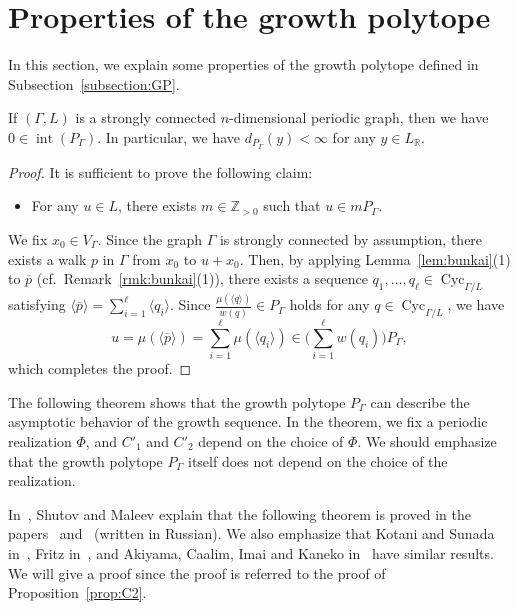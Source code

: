 \documentclass[ALCO,published]{cedram}
\theoremstyle{remark}
\begin{document}
\section{Properties of the growth polytope}\label{section:GP}

In this section, we explain some properties of the growth polytope defined in Subsection~\ref{subsection:GP}. 

\begin{lem}\label{lem:int}
If $(\Gamma, L)$ is a strongly connected $n$-dimensional periodic graph, then 
we have $0 \in \operatorname{int}(P _{\Gamma})$. 
In particular, we have $d_{P _{\Gamma}}(y) < \infty$ for any $y \in L_{\mathbb{R}}$. 
\end{lem}
\begin{proof}
It is sufficient to prove the following claim: 
\begin{itemize}
\item For any $u \in L$, there exists $m \in \mathbb{Z}_{>0}$ such that $u \in m P _{\Gamma}$. 
\end{itemize}
We fix $x_0 \in V_{\Gamma}$. 
Since the graph $\Gamma$ is strongly connected by assumption, 
there exists a walk $p$ in $\Gamma$ from $x_0$ to $u + x_0$. 
Then, by applying Lemma~\ref{lem:bunkai}(1) to $\overline{p}$ (cf.\ Remark~\ref{rmk:bunkai}(1)), 
there exists a sequence $q_1, \ldots, q_{\ell} \in \operatorname{Cyc}_{\Gamma /L}$ satisfying
$\langle \overline{p} \rangle = \sum _{i=1} ^{\ell} \langle q_i \rangle$. 
Since $\frac{\mu (\langle q \rangle)}{w(q)} \in P _{\Gamma}$ holds for any $q \in \operatorname{Cyc}_{\Gamma /L}$, 
we have 
\[
u = \mu ( \langle \overline{p} \rangle ) = \sum _{i=1}^{\ell} \mu(\langle q_i \rangle)
\in \biggl( \sum _{i=1} ^{\ell} w(q_i) \biggr) P _{\Gamma}, 
\]
which completes the proof. 
\end{proof}

The following theorem shows that the growth polytope $P _{\Gamma}$ can describe 
the asymptotic behavior of the growth sequence. 
In the theorem, we fix a periodic realization $\Phi$, and $C' _1$ and $C' _2$ depend on the choice of $\Phi$. 
We should emphasize that the growth polytope $P_{\Gamma}$ itself does not depend on the choice of the realization. 

In~\cite[Theorem 1]{SM20b}, Shutov and Maleev explain that the following theorem is proved 
in the papers~\cite{Zhu02} and~\cite{MS11} (written in Russian). 
We also emphasize that Kotani and Sunada in~\cite{KS06}, Fritz in~\cite{Fri13}, and 
Akiyama, Caalim, Imai and Kaneko in~\cite{ACIK} have similar results. 
We will give a proof since the proof is referred to the proof of Proposition~\ref{prop:C2}. 
\end{document}
